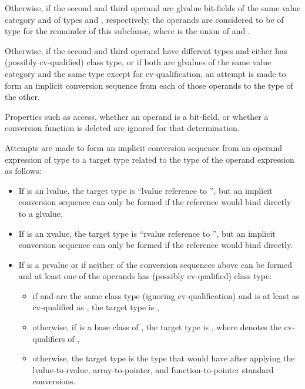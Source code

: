 \pnum
Otherwise, if the second and third operand are glvalue bit-fields
of the same value category and
of types   and  , respectively,
the operands are considered to be of type \cv{} 
for the remainder of this subclause,
where \cv{} is the union of  and .

\pnum
Otherwise, if the second and third operand have different types and
either has (possibly cv-qualified) class type, or if both
are glvalues of the same value category and the same type except for
cv-qualification, an attempt is made to
form an implicit conversion sequence from
each of those operands to the type of the other.
\begin{note}
Properties such as access, whether an operand is a bit-field, or whether
a conversion function is deleted are ignored for that determination.
\end{note}
Attempts are made to form an implicit conversion sequence
from an operand expression  of type 
to a target type related to the type 
of the operand expression  as follows:

\begin{itemize}
\item If  is an lvalue, the target type is
``lvalue reference to '',
but an implicit conversion sequence can only be formed
if the reference would bind directly
to a glvalue.

\item If  is an xvalue, the target type is
``rvalue reference to '',
but an implicit conversion sequence can only be formed
if the reference would bind directly.

\item If  is a prvalue or if neither of the conversion sequences above can be
formed and at least one of the operands has (possibly cv-qualified) class type:
\begin{itemize}
\item if  and  are the same class type
(ignoring cv-qualification) and
 is at least as cv-qualified as ,
the target type is ,

\item otherwise, if  is a base class of ,
the target type is  , where 
denotes the cv-qualifiers of ,

\item otherwise, the target type is the type that  would have
after applying the
lvalue-to-rvalue,
array-to-pointer, and
function-to-pointer
standard conversions.
\end{itemize}
\end{itemize}

